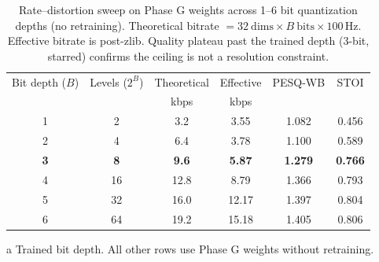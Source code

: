 \begin{table}[t]
\caption[Rate--distortion sweep across quantization depths]{Rate--distortion sweep on Phase G weights across 1--6 bit quantization depths
(no retraining). Theoretical bitrate $= 32~\text{dims} \times B~\text{bits} \times 100\,\text{Hz}$.
Effective bitrate is post-zlib. Quality plateau past the trained depth (3-bit, starred)
confirms the ceiling is not a resolution constraint.}
\label{tab:rd_sweep}
\begin{threeparttable}
\begin{tabular}{S[table-format=1.0]
S[table-format=2.0]
S[table-format=2.1]
S[table-format=2.2]
S[table-format=1.3]
S[table-format=1.3]}
\toprule
{Bit depth ($B$)}
& {Levels ($2^B$)}
& {Theoretical}
& {Effective}
& {PESQ-WB}
& {STOI} \\
&
& {kbps}
& {kbps}
&
& \\
 &  2 &  3.2 &  3.55 & 1.082 & 0.456 \\
2 &  4 &  6.4 &  3.78 & 1.100 & 0.589 \\
{\bfseries 3} & {\bfseries 8} & {\bfseries 9.6} & {\bfseries 5.87} & {\bfseries 1.279} & {\bfseries 0.766} \\
4 & 16 & 12.8 &  8.79 & 1.366 & 0.793 \\
5 & 32 & 16.0 & 12.17 & 1.397 & 0.804 \\
6 & 64 & 19.2 & 15.18 & 1.405 & 0.806 \\
\bottomrule
\end{tabular}
\begin{tablenotes}
\footnotesize
\item[a] Trained bit depth. All other rows use Phase G weights without retraining.
\end{tablenotes}
\end{threeparttable}
\end{table}

